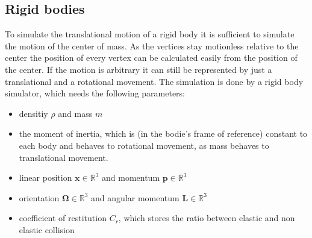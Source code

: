 \subsection{Rigid bodies}
	\cite{lecRigidBodies} To simulate the translational motion of a rigid body it is sufficient to simulate the motion of the center of mass. As the vertices stay motionless relative to the center the position of every vertex can be calculated easily from the position of the center. 
	If the motion is arbitrary it can still be represented by just a translational and a rotational movement. 
	The simulation is done by a rigid body simulator, which needs the following parameters:
	\begin{itemize}
		\item densitiy $\rho$ and mass $m$
		\item the moment of inertia, which is (in the bodie's frame of reference) constant to each body and behaves to rotational movement, as mass behaves to translational movement.
		\item linear position $\bm{x}\in\mathbb{R}^{3}$ and momentum $\bm{p}\in\mathbb{R}^{3}$
		\item orientation $\bm \Omega\in\mathbb{R}^{3}$ and angular momentum $\bm L\in\mathbb{R}^{3}$
		\item coefficient of restitution $C_r$, which stores the ratio between elastic and non elastic collision
	\end{itemize}
	
